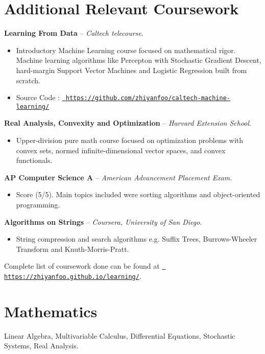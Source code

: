 \documentclass[margin]{res}
\begin{document}
\begin{resume}
\section{Additional Relevant Coursework} 

    {\bf Learning From Data} -- {\it Caltech telecourse}.
    \begin{itemize} \itemsep -2pt
        \item Introductory Machine Learning course focused on mathematical
            rigor. Machine learning
            algorithms like Percepton with Stochastic Gradient Descent,
            hard-margin Support Vector Machines and Logistic Regression built
            from scratch.
        \item Source Code :
    \href{https://github.com/zhiyanfoo/caltech-machine-learning/}{\tt
    https://github.com/zhiyanfoo/caltech-machine-learning/}
    \end{itemize} 
    {\bf Real Analysis, Convexity and Optimization} -- {\it Harvard Extension
    School}.
    \begin{itemize} \itemsep -2pt
        \item Upper-division pure math course focused on optimization problems
            with convex sets, normed infinite-dimensional vector spaces, and
            convex functionals.
    \end{itemize}
    {\bf AP Computer Science A} -- {\it American Advancement Placement Exam}. 
    \begin{itemize} \itemsep -2pt
            \item Score (5/5). Main topics included were sorting algorithms and
                object-oriented programming.
    \end{itemize}
    {\bf Algorithms on Strings} -- {\it Coursera, University of San Diego}. 
    \begin{itemize} \itemsep -2pt
        \item String compression and search algorithms  e.g. Suffix
            Trees, Burrows-Wheeler Transform and Knuth-Morris-Pratt.
    \end{itemize}
Complete list of coursework done can be found at
\href{https://zhiyanfoo.github.io/learning/}{\tt
https://zhiyanfoo.github.io/learning/}.
\section{Mathematics}
Linear Algebra, Multivariable Calculus, Differential Equations,
        Stochastic Systems, Real Analysis.

\end{resume} 
\end{document}
